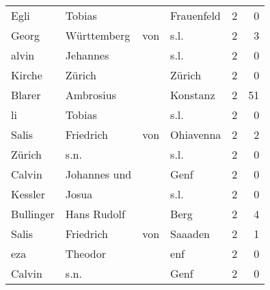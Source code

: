 \begin{tabular}{llllrr}
                     Egli &                             Tobias &             &                                  Frauenfeld &          2 &         0 \\
                    Georg &                        Württemberg &         von &                                        s.l. &          2 &         3 \\
                    alvin &                           Jehannes &             &                                        s.l. &          2 &         0 \\
                   Kirche &                             Zürich &             &                                      Zürich &          2 &         0 \\
                   Blarer &                          Ambrosius &             &                                    Konstanz &          2 &        51 \\
                       li &                             Tobias &             &                                        s.l. &          2 &         0 \\
                    Salis &                          Friedrich &         von &                                   Ohiavenna &          2 &         2 \\
                   Zürich &                               s.n. &             &                                        s.l. &          2 &         0 \\
                   Calvin &                       Johannes und &             &                                        Genf &          2 &         0 \\
                  Kessler &                              Josua &             &                                        s.l. &          2 &         0 \\
                Bullinger &                        Hans Rudolf &             &                                        Berg &          2 &         4 \\
                    Salis &                          Friedrich &         von &                                     Saaaden &          2 &         1 \\
                      eza &                            Theodor &             &                                         enf &          2 &         0 \\
                   Calvin &                               s.n. &             &                                        Genf &          2 &         0 \\

\end{tabular}
